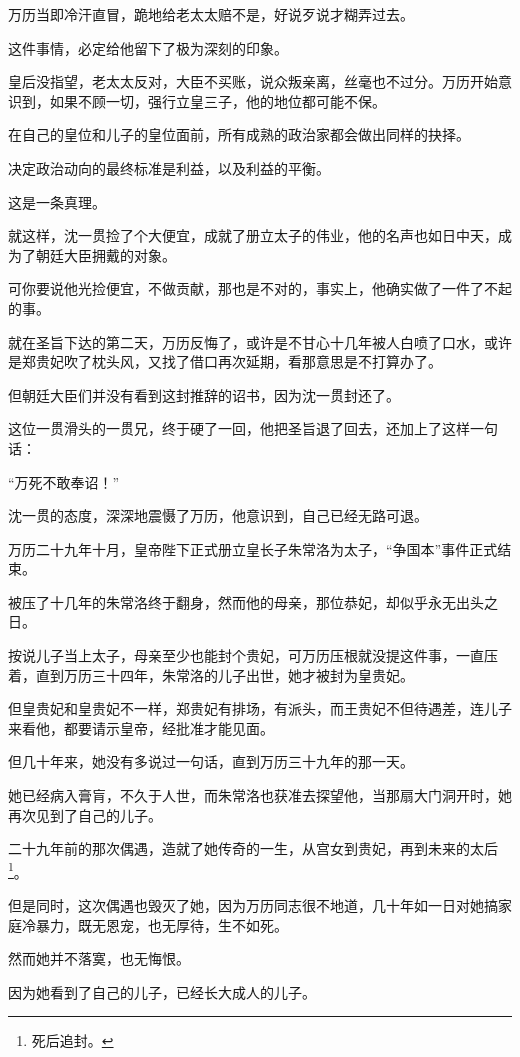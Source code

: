 \begin{multicols}{\theparacolNo}
万历当即冷汗直冒，跪地给老太太赔不是，好说歹说才糊弄过去。

这件事情，必定给他留下了极为深刻的印象。

皇后没指望，老太太反对，大臣不买账，说众叛亲离，丝毫也不过分。万历开始意识到，如果不顾一切，强行立皇三子，他的地位都可能不保。

在自己的皇位和儿子的皇位面前，所有成熟的政治家都会做出同样的抉择。

决定政治动向的最终标准是利益，以及利益的平衡。

这是一条真理。

就这样，沈一贯捡了个大便宜，成就了册立太子的伟业，他的名声也如日中天，成为了朝廷大臣拥戴的对象。

可你要说他光捡便宜，不做贡献，那也是不对的，事实上，他确实做了一件了不起的事。

就在圣旨下达的第二天，万历反悔了，或许是不甘心十几年被人白喷了口水，或许是郑贵妃吹了枕头风，又找了借口再次延期，看那意思是不打算办了。

但朝廷大臣们并没有看到这封推辞的诏书，因为沈一贯封还了。

这位一贯滑头的一贯兄，终于硬了一回，他把圣旨退了回去，还加上了这样一句话：

“万死不敢奉诏！”

沈一贯的态度，深深地震慑了万历，他意识到，自己已经无路可退。

万历二十九年十月，皇帝陛下正式册立皇长子朱常洛为太子，“争国本”事件正式结束。

被压了十几年的朱常洛终于翻身，然而他的母亲，那位恭妃，却似乎永无出头之日。

按说儿子当上太子，母亲至少也能封个贵妃，可万历压根就没提这件事，一直压着，直到万历三十四年，朱常洛的儿子出世，她才被封为皇贵妃。

但皇贵妃和皇贵妃不一样，郑贵妃有排场，有派头，而王贵妃不但待遇差，连儿子来看他，都要请示皇帝，经批准才能见面。

但几十年来，她没有多说过一句话，直到万历三十九年的那一天。

她已经病入膏肓，不久于人世，而朱常洛也获准去探望他，当那扇大门洞开时，她再次见到了自己的儿子。

二十九年前的那次偶遇，造就了她传奇的一生，从宫女到贵妃，再到未来的太后\footnote{死后追封。}。

但是同时，这次偶遇也毁灭了她，因为万历同志很不地道，几十年如一日对她搞家庭冷暴力，既无恩宠，也无厚待，生不如死。

然而她并不落寞，也无悔恨。

因为她看到了自己的儿子，已经长大成人的儿子。


\end{multicols}
